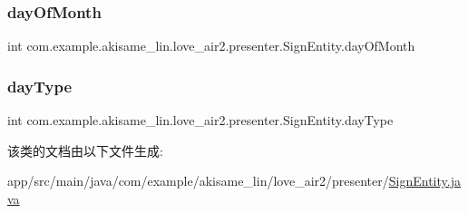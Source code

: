 \subsubsection{\texorpdfstring{dayOfMonth}{dayOfMonth}}
{\footnotesize\ttfamily int com.\+example.\+akisame\+\_\+lin.\+love\+\_\+air2.\+presenter.\+Sign\+Entity.\+day\+Of\+Month\hspace{0.3cm}{\ttfamily [private]}}

\mbox{\label{classcom_1_1example_1_1akisame__lin_1_1love__air2_1_1presenter_1_1_sign_entity_a98534aa2d25d47cc051fc8a7f23d367d}} 
\subsubsection{\texorpdfstring{dayType}{dayType}}
{\footnotesize\ttfamily int com.\+example.\+akisame\+\_\+lin.\+love\+\_\+air2.\+presenter.\+Sign\+Entity.\+day\+Type\hspace{0.3cm}{\ttfamily [private]}}



该类的文档由以下文件生成\+:\begin{DoxyCompactItemize}
\item 
app/src/main/java/com/example/akisame\+\_\+lin/love\+\_\+air2/presenter/\mbox{\hyperlink{_sign_entity_8java}{Sign\+Entity.\+java}}\end{DoxyCompactItemize}
